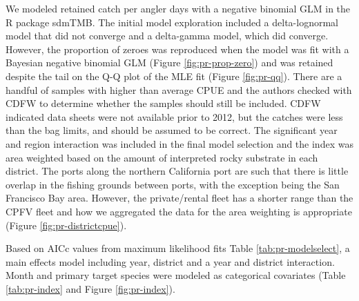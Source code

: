 \documentclass[11pt,
  letterpaper,
]{article}
\begin{document}
We modeled retained catch per angler days with a negative binomial GLM in the R package sdmTMB. The initial model exploration included a delta-lognormal model that did not converge and a delta-gamma model, which did converge. However, the proportion of zeroes was reproduced when the model was fit with a Bayesian negative binomial GLM (Figure \ref{fig:pr-prop-zero}) and was retained despite the tail on the Q-Q plot of the MLE fit (Figure \ref{fig:pr-qq}). There are a handful of samples with higher than average CPUE and the authors checked with CDFW to determine whether the samples should still be included. CDFW indicated data sheets were not available prior to 2012, but the catches were less than the bag limits, and should be assumed to be correct. The significant year and region interaction was included in the final model selection and the index was area weighted based on the amount of interpreted rocky substrate in each district. The ports along the northern California port are such that there is little overlap in the fishing grounds between ports, with the exception being the San Francisco Bay area. However, the private/rental fleet has a shorter range than the CPFV fleet and how we aggregated the data for the area weighting is appropriate (Figure \ref{fig:pr-districtcpue}).

Based on AICc values from maximum likelihood fits Table \ref{tab:pr-modelselect}, a main effects model including year, district and a year and district interaction. Month and primary target species were modeled as categorical covariates (Table \ref{tab:pr-index} and Figure \ref{fig:pr-index}).

\newpage

\begingroup\fontsize{10}{12}\selectfont
\begingroup\fontsize{10}{12}\selectfont
\end{document}
